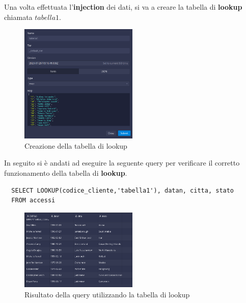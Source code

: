 \documentclass{article}
\begin{document}
Una volta effettuata l'\textbf{injection} dei dati, si va a creare la tabella di \textbf{lookup} chiamata $tabella1$.
\begin{figure}[H]
    \centering
    \includegraphics[width=0.5\textwidth]{images/inserimento_lookup.png}
    \caption{Creazione della tabella di lookup}
\end{figure}
In seguito si è andati ad eseguire la seguente query per verificare il corretto funzionamento della tabella di \textbf{lookup}.
\begin{lstlisting}
  SELECT LOOKUP(codice_cliente,'tabella1'), datan, citta, stato
  FROM accessi
\end{lstlisting}
\begin{figure}[H]
    \centering
    \includegraphics[width=0.5\textwidth]{images/lookup.png}
    \caption{Risultato della query utilizzando la tabella di lookup}
\end{figure}








\end{document}
